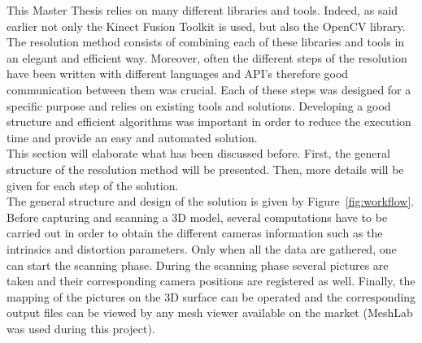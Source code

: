 This Master Thesis relies on many different libraries and tools. Indeed, as said earlier not only the Kinect Fusion Toolkit is used, but also the OpenCV library. The resolution method consists of combining each of these libraries and tools in an elegant and efficient way. Moreover, often the different steps of the resolution have been written with different languages and API's therefore good communication between them was crucial. Each of these steps was designed for a specific purpose and relies on existing tools and solutions. Developing a good structure and efficient algorithms was important in order to reduce the execution time and provide an easy and automated solution.\\

This section will elaborate what has been discussed before. First, the general structure of the resolution method will be presented. Then, more details will be given for each step of the solution.\\

The general structure and design of the solution is given by Figure~\ref{fig:workflow}. Before capturing and scanning a 3D model, several computations have to be carried out in order to obtain the different cameras information such as the intrinsics and distortion parameters. Only when all the data are gathered, one can start the scanning phase. During the scanning phase several pictures are taken and their corresponding camera positions are registered as well. Finally, the mapping of the pictures on the 3D surface can be operated and the corresponding output files can be viewed by any mesh viewer available on the market (MeshLab was used during this project).\\


